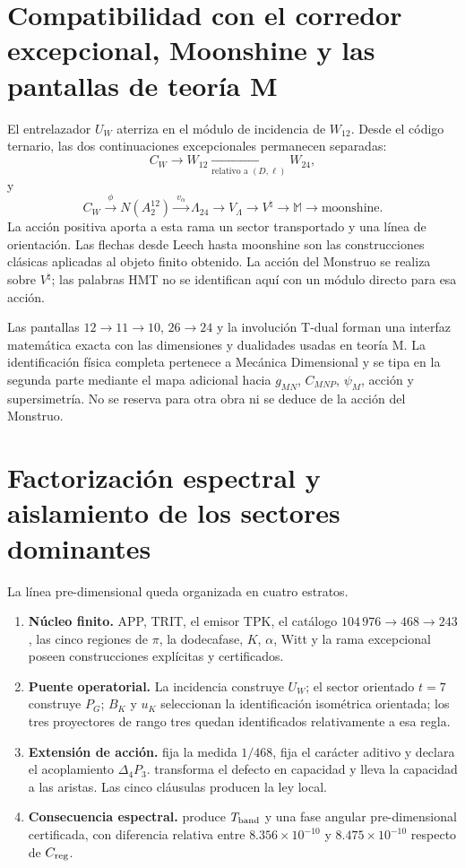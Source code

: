 \section{Compatibilidad con el corredor excepcional, Moonshine y las pantallas de teoría M}

El entrelazador \(U_W\) aterriza en el módulo de incidencia de \(W_{12}\).
Desde el código ternario, las dos continuaciones excepcionales permanecen
separadas:
\[
 C_W\longrightarrow W_{12}
 \xrightarrow[\text{relativo a }(D,\ell)]{}W_{24},
\]
y
\[
 C_W\xrightarrow{\ \phi\ } N(A_2^{12})
\xrightarrow{\ v_\alpha\ }\Lambda_{24}
\longrightarrow V_\Lambda
\longrightarrow V^\natural
\longrightarrow\mathbb M
\longrightarrow\text{moonshine}.
\]
La acción positiva aporta a esta rama un sector transportado y una línea de
orientación. Las flechas desde Leech hasta moonshine son las construcciones
clásicas aplicadas al objeto finito obtenido. La acción del Monstruo se
realiza sobre \(V^\natural\); las palabras HMT no se identifican aquí con un
módulo directo para esa acción.

Las pantallas \(12\to11\to10\), \(26\to24\) y la involución T-dual forman
una interfaz matemática exacta con las dimensiones y dualidades usadas en
teoría M. La identificación física completa pertenece a Mecánica
Dimensional y se tipa en la segunda parte mediante el mapa adicional hacia
\(g_{MN}\), \(C_{MNP}\), \(\psi_M\), acción y supersimetría. No se reserva
para otra obra ni se deduce de la acción del Monstruo.

\section{Factorización espectral y aislamiento de los sectores dominantes}

La línea pre-dimensional queda organizada en cuatro estratos.
\begin{enumerate}
  \item \textbf{Núcleo finito.} APP, TRIT, el emisor TPK, el catálogo
  \(104\,976\to468\to243\), las cinco regiones de \(\pi\), la
  dodecafase, \(K\), \(\alpha\), Witt y la rama excepcional poseen
  construcciones explícitas y certificados.
  \item \textbf{Puente operatorial.} La incidencia construye \(U_W\);
  el sector orientado \(t=7\) construye \(P_G\); \(B_K\) y \(u_K\) seleccionan
  la identificación isométrica orientada; los tres proyectores de rango tres
  quedan identificados relativamente a esa regla.
  \item \textbf{Extensión de acción.} \HTr fija la medida \(1/468\), \HAdd
  fija el carácter aditivo y \HDef declara el acoplamiento
  \(\Delta_4P_3\). \HRes transforma el defecto en capacidad y \HLoc lleva la
  capacidad a las aristas. Las cinco cláusulas producen la ley local.
  \item \textbf{Consecuencia espectral.} \Gtr produce
  \(T_{\rm band}\) y una fase angular pre-dimensional certificada, con
  diferencia relativa entre \(8.356\times10^{-10}\) y
  \(8.475\times10^{-10}\) respecto de \(C_{\rm reg}\).
\end{enumerate}

